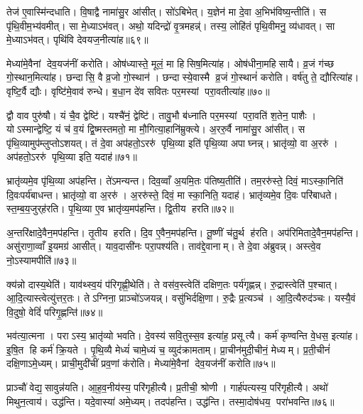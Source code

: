 तेज॑ ए॒वास्मि॑न्दधाति। वि॒षाद्वै नामा॑सु॒र आ॑सीत्। सो॑ऽबिभेत्। य॒ज्ञेन॑ मा दे॒वा अ॒भिभ॑विष्य॒न्तीति॑। स पृ॑थि॒वीम॒भ्य॑वमीत्। सा मे॒ध्याऽभ॑वत्। अथो॒ यदिन्द्रो॑ वृ॒त्रमहन्न्॑। तस्य॒ लोहि॑तं पृथि॒वीमनु॒ व्य॑धावत्। सा मे॒ध्याऽभ॑वत्। पृथि॑वि देवयज॒नीत्या॑ह॥६९॥

मेध्या॑मे॒वैनां देव॒यज॑नीं करोति। ओष॑ध्यास्ते॒ मूलं॒ मा हिसिष॒मित्या॑ह। ओष॑धीना॒महिसायै। व्र॒जं ग॑च्छ गो॒स्थान॒मित्या॑ह। छन्दासि॒ वै व्र॒जो गो॒स्थान॑। छन्दास्ये॒वास्मै व्र॒जं गो॒स्थानं॑ करोति। वर्\mbox{}ष॑तु ते॒ द्यौरित्या॑ह। वृष्टि॒र्वै द्यौः। वृष्टि॑मे॒वाव॑ रुन्धे। ब॒धा॒न दे॑व सवितः पर॒मस्यां परा॒वतीत्या॑ह॥७०॥

द्वौ वाव पुरु॑षौ। यं चै॒व द्वेष्टि॑। यश्चै॑नं॒ द्वेष्टि॑। तावु॒भौ ब॑ध्नाति पर॒मस्यां परा॒वति॑ श॒तेन॒ पाशैः। योऽस्मान्द्वेष्टि॒ यं च॑ व॒यं द्वि॒ष्मस्तमतो॒ मा मौ॒गित्या॒हानि॑म्रुक्त्ये। अ॒ररु॒र्वै नामा॑सु॒र आ॑सीत्। स पृ॑थि॒व्यामुप॑म्लुप्तोऽशयत्। तं दे॒वा अप॑हतो॒ऽररु॑ पृथि॒व्या इति॑ पृथि॒व्या अपाघ्नन्न्। भ्रातृ॑व्यो॒ वा अ॒ररु॑। अप॑हतो॒ऽररु॑ पृथि॒व्या इति॒ यदाह॑॥७१॥

भ्रातृ॑व्यमे॒व पृ॑थि॒व्या अप॑हन्ति। ते॑ऽमन्यन्त। दिव॒व्वाँ अ॒यमि॒तः प॑तिष्य॒तीति॑। तम॒ररु॑स्ते॒ दिवं॒ माऽस्का॒निति॑ दि॒वःपर्य॑बाधन्त। भ्रातृ॑व्यो॒ वा अ॒ररु॑। अ॒ररु॑स्ते॒ दिवं॒ मा स्का॒निति॒ यदाह॑। भ्रातृ॑व्यमे॒व दि॒वः परि॑बाधते। स्त॒म्ब॒य॒जुर्‌ह॑रति। पृ॒थि॒व्या ए॒व भ्रातृ॑व्य॒मप॑हन्ति। द्वि॒तीय हरति॥७२॥

अ॒न्तरि॑क्षादे॒वैन॒मप॑हन्ति। तृ॒तीय हरति। दि॒व ए॒वैन॒मप॑हन्ति। तू॒ष्णीं च॑तु॒र्थ ह॑रति। अप॑रिमितादे॒वैन॒मप॑हन्ति। असु॑राणा॒व्वाँ इ॒यमग्र॑ आसीत्। याव॒दासी॑नः परा॒पश्य॑ति। ताव॑द्दे॒वानाम्। ते दे॒वा अ॑ब्रुवन्न्। अस्त्वे॒व नो॒ऽस्यामपीति॑॥७३॥

क्य॑न्नो दास्य॒थेति॑। याव॑थ्स्व॒यं प॑रिगृह्णी॒थेति॑। ते वस॑व॒स्त्वेति॑ दक्षिण॒तः पर्य॑गृह्णन्न्। रु॒द्रास्त्वेति॑ प॒श्चात्। आ॒दि॒त्यास्त्वेत्यु॑त्तर॒तः। तेऽग्निना॒ प्राञ्चो॑ऽजयन्न्। वसु॑भिर्दक्षि॒णा। रु॒द्रैः प्र॒त्यञ्च॑। आ॒दि॒त्यैरुद॑ञ्चः। यस्यै॒वं वि॒दुषो॒ वेदिं॑ परिगृ॒ह्णन्ति॑॥७४॥

भव॑त्या॒त्मना। पराऽस्य॒ भ्रातृ॑व्यो भवति। दे॒वस्य॑ सवि॒तुस्स॒व इत्या॑ह॒ प्रसूत्यै। कर्म॑ कृण्वन्ति वे॒धस॒ इत्या॑ह। इ॒षि॒त हि कर्म॑ क्रि॒यते। पृ॒थि॒व्यै मेध्यं॑ चामे॒ध्यं च॒ व्युद॑क्रामताम्। प्रा॒चीन॑मुदी॒चीनं॒ मेध्यम्। प्र॒ती॒चीनं॑ दक्षि॒णाऽमे॒ध्यम्। प्राची॒मुदी॑चीं प्रव॒णां क॑रोति। मेध्या॑मे॒वैनां देव॒यज॑नीं करोति॥७५॥

प्राञ्चौ॑ वेद्य॒सावुन्न॑यति। आ॒ह॒व॒नीय॑स्य॒ परि॑गृहीत्यै। प्र॒तीची॒ श्रोणी। गार्ह॑पत्यस्य॒ परि॑गृहीत्यै। अथो॑ मिथुन॒त्वाय॑। उद्ध॑न्ति। यदे॒वास्या॑ अमे॒ध्यम्। तदप॑हन्ति। उद्ध॑न्ति। तस्मा॒दोष॑धय॒ परा॑भवन्ति॥७६॥

